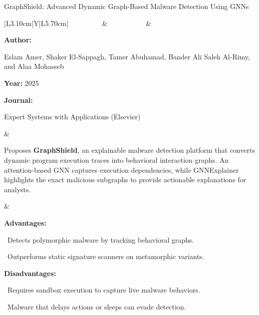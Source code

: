 \documentclass[aspectratio=169,10pt]{beamer}
\newcommand{\lrhdr}{%
  \rowcolor{prismNavy}%
  {\scriptsize\textcolor{white}{\textbf{Citation}}} &
  {\scriptsize\textcolor{white}{\textbf{Summary}}} &
  {\scriptsize\textcolor{white}{\textbf{Advantages \& Disadvantages}}} \\}
\begin{document}
\begin{frame}[t]{GraphShield: Advanced Dynamic Graph-Based Malware Detection Using GNNs}
\vspace{-0.30em}
{\footnotesize\setlength{\tabcolsep}{3.5pt}\renewcommand{\arraystretch}{1.10}
\begin{tabularx}{\textwidth}{|L{3.10cm}|Y|L{5.70cm}|}
\hline\lrhdr\hline
\begin{minipage}[t]{\linewidth}\fontsize{7.2pt}{9.2pt}\raggedright\selectfont
\textbf{Author:}\par
Eslam Amer, Shaker El-Sappagh, Tamer Abuhamad, Bander Ali Saleh Al-Rimy, and Alaa Mohasseb\par\vspace{4pt}
\textbf{Year:} 2025\par\vspace{4pt}
\textbf{Journal:}\par
Expert Systems with Applications (Elsevier)\par\vspace{4pt}
\end{minipage}
&
\begin{minipage}[t]{\linewidth}\fontsize{7.2pt}{9.2pt}\raggedright\selectfont
Proposes \textbf{GraphShield}, an explainable malware detection platform that converts dynamic program execution traces into behavioral interaction graphs. An attention-based GNN captures execution dependencies, while GNNExplainer highlights the exact malicious subgraphs to provide actionable explanations for analysts.\par\vspace{4pt}
\end{minipage}
&
\begin{minipage}[t]{\linewidth}\fontsize{7.2pt}{9.0pt}\raggedright\selectfont
\textcolor{strengthGreen}{\textbf{Advantages:}}\par\vspace{1.5pt}
\textbullet~Detects polymorphic malware by tracking behavioral graphs.\par\vspace{2.0pt}\textbullet~Outperforms static signature scanners on metamorphic variants.\par\vspace{4.0pt}
\textcolor{limitRed}{\textbf{Disadvantages:}}\par\vspace{1.5pt}
\textbullet~Requires sandbox execution to capture live malware behaviors.\par\vspace{2.0pt}\textbullet~Malware that delays actions or sleeps can evade detection.\par\vspace{4pt}
\end{minipage} \\\hline
\end{tabularx}}
\end{frame}
\end{document}
